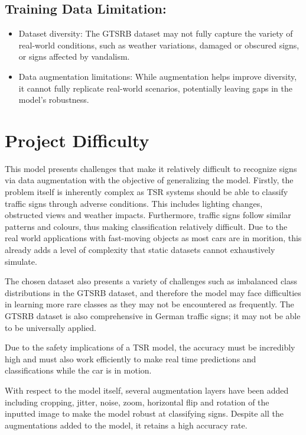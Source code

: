 \documentclass{article} %
\begin{document}
\subsection{Training Data Limitation:}
\begin{itemize}
    \item Dataset diversity: The GTSRB dataset may not fully capture the variety of real-world conditions, such as weather variations, damaged or obscured signs, or signs affected by vandalism.
    \item Data augmentation limitations: While augmentation helps improve diversity, it cannot fully replicate real-world scenarios, potentially leaving gaps in the model's robustness.
\end{itemize}
\section{Project Difficulty}
This model presents challenges that make it relatively difficult to recognize signs via data augmentation with the objective of generalizing the model. Firstly, the problem itself is inherently complex as TSR systems should be able to classify traffic signs through adverse conditions. This includes lighting changes, obstructed views and weather impacts. Furthermore, traffic signs follow similar patterns and colours, thus making classification relatively difficult. Due to the real world applications with fast-moving objects as most cars are in morition, this already adds a level of complexity that static datasets cannot exhaustively simulate.

The chosen dataset also presents a variety of challenges such as imbalanced class distributions in the GTSRB dataset, and therefore the model may face difficulties in learning more rare classes as they may not be encountered as frequently. The GTSRB dataset is also comprehensive in German traffic signs; it may not be able to be universally applied.

Due to the safety implications of a TSR model, the accuracy must be incredibly high and must also work efficiently to make real time predictions and classifications while the car is in motion.

With respect to the model itself, several augmentation layers have been added including cropping, jitter, noise, zoom, horizontal flip and rotation of the inputted image to make the model robust at classifying signs. Despite all the augmentations added to the model, it retains a high accuracy rate.



\newpage


\label{last_page}



\end{document}
